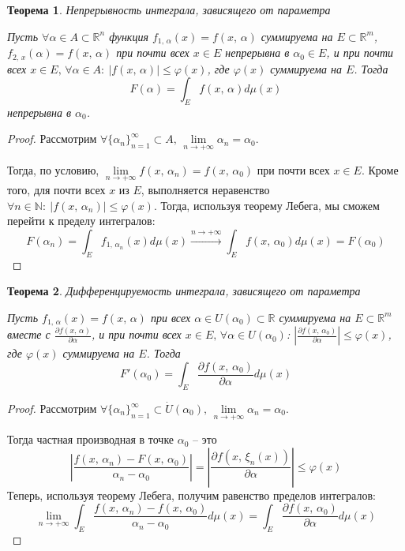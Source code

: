 \documentclass[a4paper,12pt]{article}
\renewcommand{\phi}{\ensuremath{\varphi}}
\renewcommand{\leq}{\ensuremath{\leqslant}}
\theoremstyle{plain}
\newtheorem{theorem}{Теорема}[section]
\theoremstyle{definition}
\theoremstyle{remark}
\begin{document}
\begin{theorem}
	Непрерывность интеграла, зависящего от параметра

	Пусть $\forall \alpha \in A \subset \mathbb{R}^n$ функция $f_{1,\,\alpha}(x) = f(x,\,\alpha)$ суммируема на $E \subset \mathbb{R}^m$, $f_{2,\,x}(\alpha) = f(x,\,\alpha)$ при почти всех $x \in E$ непрерывна в $\alpha_0 \in E$, и при почти всех $x \in E,\, \forall \alpha \in A :\: |f(x,\,\alpha)| \leq \phi(x)$, где $\phi(x)$ суммируема на $E$. Тогда
	\[F(\alpha) = \int_E f(x,\, \alpha)d\mu(x)\]
	непрерывна в $\alpha_0$.
\end{theorem}

\begin{proof}
	Рассмотрим $\forall \{\alpha_n\}_{n = 1}^\infty \subset A,\, \lim\limits_{n\to +\infty}\alpha_n = \alpha_0$.

	Тогда, по условию, $\lim\limits_{n \to +\infty} f(x,\,\alpha_n) = f(x,\,\alpha_0)$ при почти всех $x \in E$. Кроме того, для почти всех $x$ из $E$, выполняется неравенство $\forall n \in \mathbb{N}:\: |f(x,\,\alpha_n)| \leq \phi(x)$. Тогда, используя теорему Лебега, мы сможем перейти к пределу интегралов:
	\[F(\alpha_n) = \int_E f_{1,\, \alpha_n}(x)d\mu(x) \stackrel{n \to +\infty}{\to} \int_E f(x,\,\alpha_0)d\mu(x) = F(\alpha_0)\]
\end{proof}

\begin{theorem}
	Дифференцируемость интеграла, зависящего от параметра

	Пусть $f_{1,\,\alpha}(x) = f(x,\,\alpha)$ при всех $\alpha \in U(\alpha_0) \subset \mathbb{R}$ суммируема на $E \subset \mathbb{R}^m$ вместе с $\frac{\partial f(x,\,\alpha)}{\partial \alpha}$, и при почти всех $x \in E,\, \forall \alpha \in U(\alpha_0)$: $\left|\frac{\partial f(x,\,\alpha_0)}{\partial \alpha}\right| \leq \phi(x)$, где $\phi(x)$ суммируема на $E$. Тогда
	\[F'(\alpha_0) = \int_E \frac{\partial f(x,\,\alpha_0)}{\partial \alpha}d\mu(x)\]
\end{theorem}

\begin{proof}
	Рассмотрим $\forall \{\alpha_n\}_{n = 1}^\infty \subset \dot{U}(\alpha_0),\, \lim\limits_{n \to +\infty}\alpha_n = \alpha_0$.

	Тогда частная производная в точке $\alpha_0$ -- это 
	\[\left|\frac{f(x,\,\alpha_n) - F(x,\,\alpha_0)}{\alpha_n - \alpha_0}\right| = \left|\frac{\partial f(x,\,\xi_n(x))}{\partial \alpha}\right| \leq \phi(x)\]
	Теперь, используя теорему Лебега, получим равенство пределов интегралов:
	\[\lim_{n \to +\infty}\int_E \frac{f(x,\,\alpha_n) - f(x,\,\alpha_0)}{\alpha_n - \alpha_0}d\mu(x) = \int_E \frac{\partial f(x,\,\alpha_0)}{\partial	\alpha}d\mu(x)\]
\end{proof}
\end{document}
